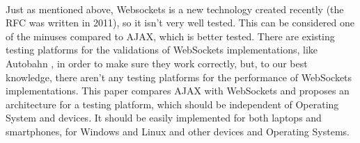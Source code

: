 \documentclass[conference]{IEEEtran}
\begin{document}
\\
\indent
Just as mentioned above, Websockets is a new technology created recently
(the RFC was written in 2011), so it isn't very well tested. This can be
considered one of the minuses compared to AJAX, which is better tested. There
are existing testing platforms for the validations of WebSockets implementations,
like Autobahn \cite{Autobahn}, in order to make sure they work correctly, but,
to our best knowledge, there aren't any testing platforms for the performance of
WebSockets implementations. This paper compares AJAX with WebSockets and proposes
an architecture for a testing platform, which should be independent of Operating
System and devices. It should be easily implemented for both laptops and
smartphones, for Windows and Linux and other devices and Operating Systems.
\end{document}
